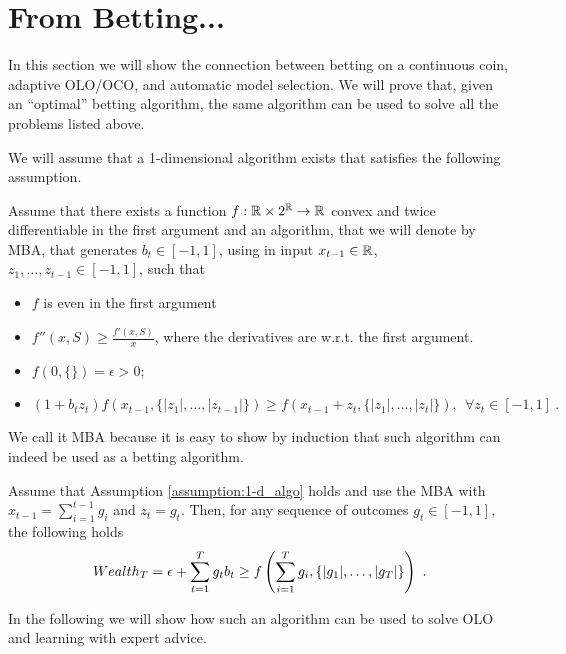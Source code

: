 \section{From Betting...}

In this section we will show the connection between betting on a continuous coin, adaptive \ac{OLO}/\ac{OCO}, and automatic model selection. We will prove that, given an ``optimal'' betting algorithm, the same algorithm can be used to solve all the problems listed above.

We will assume that a 1-dimensional algorithm exists that satisfies the following assumption.
\begin{assumption}
\label{assumption:1-d_algo}
Assume that there exists a function $f:\mathbb{R} \times 2^{\mathbb{R}} \rightarrow \mathbb{R}$ convex and twice differentiable in the first argument and an algorithm, that we will denote by \ac{MBA}, that generates $b_t \in [-1 , 1]$, using in input $x_{t-1} \in \mathbb{R}$, $z_1, \ldots, z_{t-1} \in [-1,1]$, such that
\begin{itemize}
\item $f$ is even in the first argument
\item $f''(x, S) \geq \frac{f'(x,S)}{x}$, where the derivatives are w.r.t. the first argument.
\item $f(0,\{\})=\epsilon>0$;
\item  \begin{equation}
\label{eq:1_d_hp}
(1+b_t z_t) f\left( x_{t-1}, \{|z_1|, \ldots, |z_{t-1}|\} \right) \geq f\left( x_{t-1}+z_t, \{|z_1|, \ldots, |z_t|\}\right), \ \ \forall z_{t} \in [-1,1]~.
\end{equation}
\end{itemize}
\end{assumption}

We call it \ac{MBA} because it is easy to show by induction that such algorithm can indeed be used as a betting algorithm.
\begin{theorem}
\label{theo:1-d_reward}
Assume that Assumption \ref{assumption:1-d_algo} holds and use the \ac{MBA} with $x_{t-1}=\sum_{i=1}^{t-1} g_i$ and $z_t=g_t$.
Then, for any sequence of outcomes $g_t \in [-1,1]$, the following holds
\[
Wealth_T = \epsilon+\sum_{t=1}^T g_t b_t \geq f\left( \sum_{i=1}^{T} g_i , \left\{|g_1|, \ldots, |g_T|\right\}\right)~.
\]
\end{theorem}

In the following we will show how such an algorithm can be used to solve \ac{OLO} and learning with expert advice.

